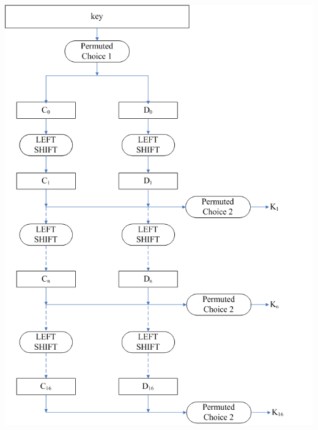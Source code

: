 \documentclass[11pt]{article}
\begin{document}
\begin{center}\includegraphics[scale=0.3]{../pictures/key_schedule.png}\end{center}
\end{document}
